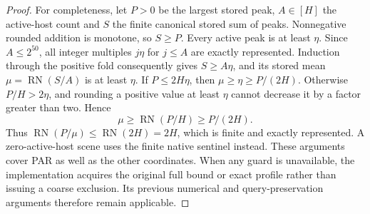 \documentclass[11pt]{article}
\begin{document}
\begin{proof}
For completeness, let $P>0$ be the largest stored peak, $A\in[H]$ the active-host count and $S$ the finite canonical stored sum of peaks. Nonnegative rounded addition is monotone, so $S\ge P$. Every active peak is at least $\eta$. Since $A\le2^{50}$, all integer multiples $j\eta$ for $j\le A$ are exactly represented. Induction through the positive fold consequently gives $S\ge A\eta$, and its stored mean $\mu=\operatorname{RN}(S/A)$ is at least $\eta$. If $P\le2H\eta$, then $\mu\ge\eta\ge P/(2H)$. Otherwise $P/H>2\eta$, and rounding a positive value at least $\eta$ cannot decrease it by a factor greater than two. Hence
\begin{equation}
\mu\ge\operatorname{RN}(P/H)\ge P/(2H).
\end{equation}
Thus $\operatorname{RN}(P/\mu)\le\operatorname{RN}(2H)=2H$, which is finite and exactly represented. A zero-active-host scene uses the finite native sentinel instead. These arguments cover PAR as well as the other coordinates. When any guard is unavailable, the implementation acquires the original full bound or exact profile rather than issuing a coarse exclusion. Its previous numerical and query-preservation arguments therefore remain applicable.
\end{proof}
\end{document}
